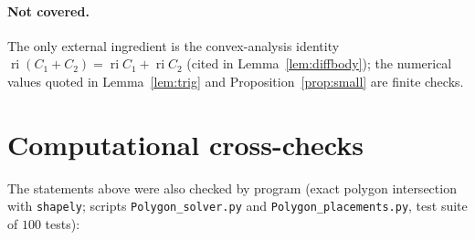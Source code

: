 \documentclass[11pt,a4paper]{article}
\theoremstyle{definition}
\theoremstyle{remark}
\begin{document}
\paragraph{Not covered.} The only external ingredient is the convex-analysis identity $\operatorname{ri}(C_1+C_2)=\operatorname{ri}C_1+\operatorname{ri}C_2$ (cited in Lemma~\ref{lem:diffbody}); the numerical values quoted in Lemma~\ref{lem:trig} and Proposition~\ref{prop:small} are finite checks.

\section{Computational cross-checks}\label{sec:verif}

The statements above were also checked by program (exact polygon intersection with \texttt{shapely}; scripts \texttt{Polygon\_solver.py} and \texttt{Polygon\_placements.py}, test suite of $100$ tests):
\end{document}
